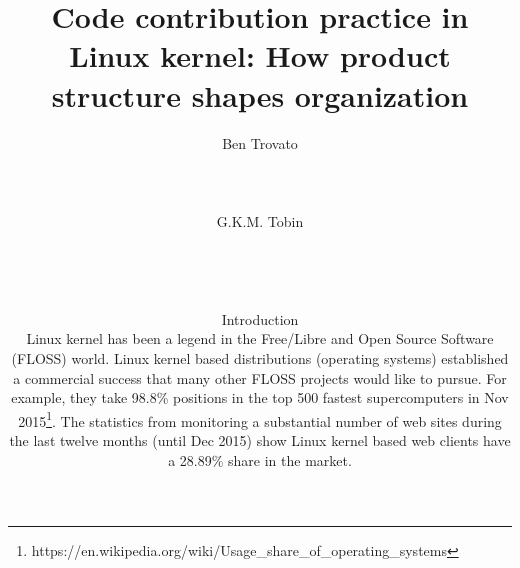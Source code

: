\documentclass{sig-alternate-05-2015}
\begin{document}

\title{Code contribution practice in Linux kernel:
How product structure shapes organization}

\author{
\alignauthor
Ben Trovato\\
       \\
       \\
       \\
\alignauthor
G.K.M. Tobin\\
       \\
       \\
       \\

\maketitle
\begin{abstract}

\end{abstract}

\section{Introduction}

%
Linux kernel has been a legend in the Free/Libre and Open Source Software (FLOSS) world.
Linux kernel based distributions (operating systems) established a commercial success
that many other FLOSS projects would like to pursue.
For example, they take 98.8\% positions in the top 500 fastest supercomputers
in Nov 2015\footnote{https://en.wikipedia.org/wiki/Usage\_share\_of\_operating\_systems}.
The statistics from monitoring a substantial number of web sites during the
last twelve months (until Dec 2015) show Linux kernel based
web clients have a 28.89\% share in the market.

}
\end{document}
